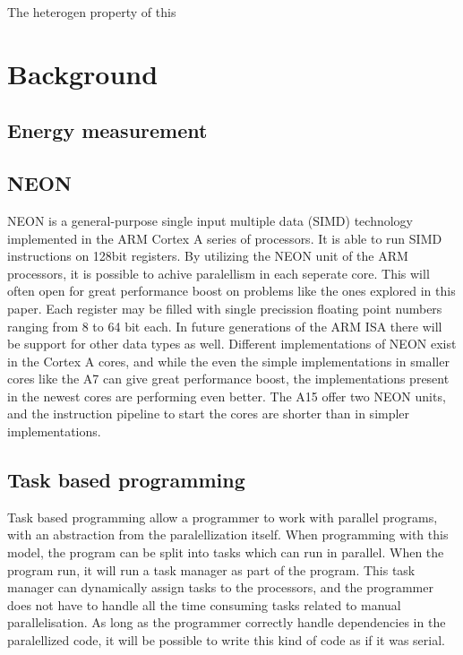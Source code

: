 The heterogen property of this 
\chapter[Background]{Background}

\section{Energy measurement}

\section{NEON}
NEON is a general-purpose single input multiple data (SIMD) technology implemented in the ARM Cortex A series of processors.
It is able to run SIMD instructions on 128bit registers.
By utilizing the NEON unit of the ARM processors, it is possible to achive paralellism in each seperate core.
This will often open for great performance boost on problems like the ones explored in this paper.
Each register may be filled with single precission floating point numbers ranging from 8 to 64 bit each.
In future generations of the ARM ISA there will be support for other data types as well.
Different implementations of NEON exist in the Cortex A cores, and while the even the simple implementations in smaller cores like the A7 can give great performance boost, the implementations present in the newest cores are performing even better.
The A15 offer two NEON units, and the instruction pipeline to start the cores are shorter than in simpler implementations.



\section{Task based programming}
Task based programming allow a programmer to work with parallel programs, with an abstraction from the paralellization itself.
When programming with this model, the program can be split into tasks which can run in parallel.
When the program run, it will run a task manager as part of the program.
This task manager can dynamically assign tasks to the processors, and the programmer does not have to handle all the time consuming tasks related to manual parallelisation.
As long as the programmer correctly handle dependencies in the paralellized code, it will be possible to write this kind of code as if it was serial.

